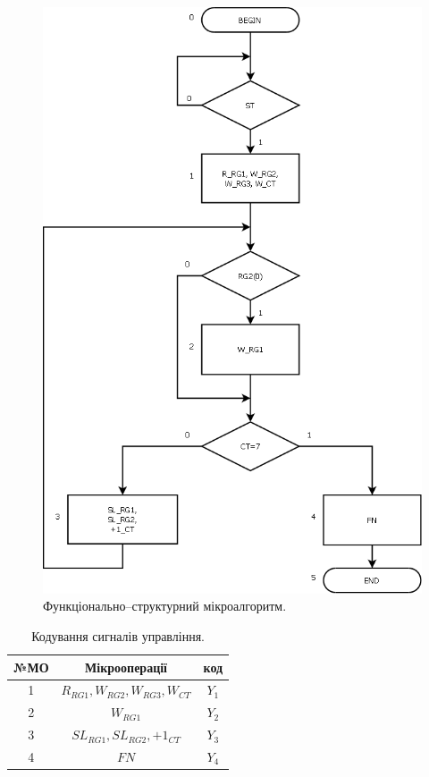 \documentclass[a4paper, 10pt]{article}
\begin{document}
\begin{figure}[H]
\begin{center}
\includegraphics[scale=0.25]{fs_alg.png}
\caption{Функціонально--структурний мікроалгоритм.}
\end{center}
\end{figure}

\begin{table}[h!]
\centering
\begin{tabular}{|c|c|c|}
\hline
№МО & Мікрооперації & код\\
\hline
1 & $R_{RG1}, W_{RG2}, W_{RG3}, W_{CT}$ & $Y_1$ \\
2 & $W_{RG1}$                           & $Y_2$\\
3 & $SL_{RG1}, SL_{RG2}, +1_{CT}$       & $Y_3$ \\
4 & $FN$                                & $Y_4$ \\
\hline
\end{tabular}
\caption{Кодування сигналів управління.}
\end{table}
\end{document}
